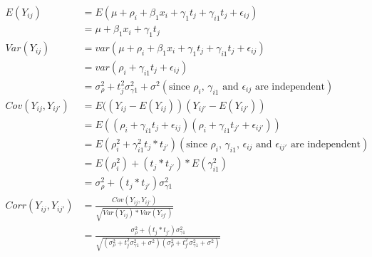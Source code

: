 \documentclass{article}\usepackage[]{graphicx}\usepackage[]{color}
\begin{document}
\begin{enumerate}[(a)]
\begin{displaymath}
\begin{split}
  E(Y_{ij}) &= E(\mu + \rho_i + \beta_1 x_i + \gamma_1 t_j + \gamma_{i1} t_j+ \epsilon_{ij})\\
            &= \mu + \beta_1 x_i + \gamma_1 t_j \\
  Var(Y_{ij}) &= var(\mu + \rho_i + \beta_1 x_i + \gamma_1 t_j + \gamma_{i1} t_j+ \epsilon_{ij})\\
              &= var(\rho_i + \gamma_{i1} t_j+ \epsilon_{ij}) \\
              &= \sigma^2_\rho + t^2_j \sigma^2_{\gamma 1}+ \sigma^2 (\text{since $\rho_i$, $\gamma_{i1}$ and $\epsilon_{ij}$ are independent} )\\
  Cov(Y_{ij}, Y_{ij'}) &= E((Y_{ij}-E(Y_{ij}))(Y_{ij'}-E(Y_{ij'}))\\
                       &= E((\rho_i+\gamma_{i1} t_j+\epsilon_{ij})(\rho_i+\gamma_{i1} t_{j'}+\epsilon_{ij'})) \\
                       &= E(\rho_i^2 + \gamma^2_{i1} t_j*t_{j'}) (\text{since $\rho_i$, $\gamma_{i1}$, $\epsilon_{ij}$ and $\epsilon_{ij'}$ are independent} )\\
                       &= E(\rho_i^2) + (t_j*t_{j'}) *E(\gamma^2_{i1})\\
                       &= \sigma^2_\rho + (t_j*t_{j'}) \sigma^2_{\gamma 1}\\
  Corr(Y_{ij}, Y_{ij'}) &= \frac{Cov(Y_{ij}, Y_{ij'})}{\sqrt{Var(Y_{ij}) * Var(Y_{ij'})}} \\
                        &= \frac{\sigma^2_\rho + (t_j*t_{j'}) \sigma^2_{\gamma 1}}{\sqrt{(\sigma^2_\rho + t^2_j \sigma^2_{\gamma 1}+ \sigma^2)(\sigma^2_\rho + t^2_{j'} \sigma^2_{\gamma 1}+ \sigma^2)}}
\end{split}
\end{displaymath}

\end{enumerate}
\end{document}

